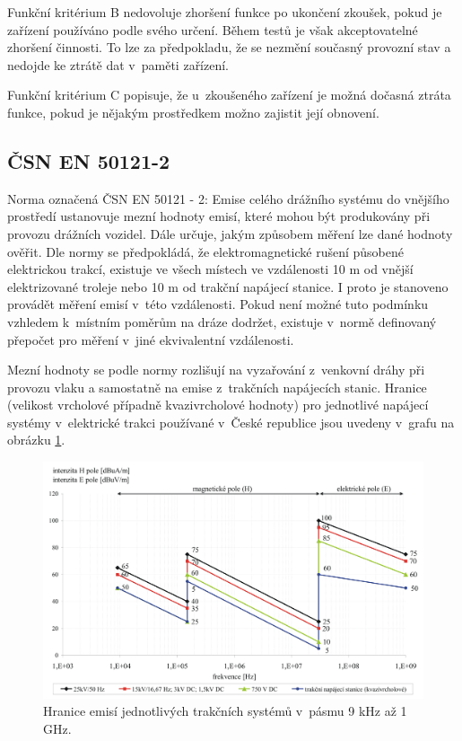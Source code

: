 Funkční kritérium B nedovoluje zhoršení funkce po ukončení zkoušek, pokud je zařízení používáno podle svého určení. Během testů je však akceptovatelné zhoršení činnosti. To lze za předpokladu, že se nezmění současný provozní stav a nedojde ke ztrátě dat v~paměti zařízení.

Funkční kritérium C popisuje, že u~zkoušeného zařízení je možná dočasná ztráta funkce, pokud je nějakým prostředkem možno zajistit její obnovení.

\subsection{ČSN EN 50121-2}
Norma označená ČSN EN 50121 - 2: Emise celého drážního  systému do vnějšího prostředí ustanovuje mezní hodnoty emisí, které mohou být produkovány při provozu drážních vozidel. Dále určuje, jakým způsobem měření lze dané hodnoty ověřit. Dle normy se předpokládá, že elektromagnetické rušení působené elektrickou trakcí, existuje ve všech místech ve vzdálenosti 10 m od vnější elektrizované troleje nebo 10 m od trakční napájecí stanice. I proto je stanoveno provádět měření emisí v~této vzdálenosti. Pokud není možné tuto podmínku vzhledem k~místním poměrům na dráze dodržet, existuje v~normě definovaný přepočet pro měření v~jiné ekvivalentní vzdálenosti. 

Mezní hodnoty se podle normy rozlišují na vyzařování z~venkovní dráhy při provozu vlaku a samostatně na emise z~trakčních napájecích stanic. Hranice (velikost vrcholové případně kvazivrcholové hodnoty) pro jednotlivé napájecí systémy v~elektrické trakci používané v~České republice jsou uvedeny v~grafu na obrázku \ref{obr:emc_emise}.

\begin{figure}[!h]
	\centering
	\includegraphics[width=12cm]{emc_emise.png}
	\caption{Hranice emisí jednotlivých trakčních systémů v~pásmu 9 kHz až 1 GHz.}
	\label{obr:emc_emise}
\end{figure}

